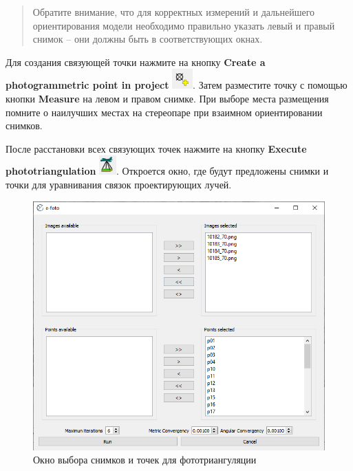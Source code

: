 \documentclass[
  12pt,
]{book}
\begin{document}
\begin{quote}
Обратите внимание, что для корректных измерений и дальнейшего ориентирования модели необходимо правильно указать левый и правый снимок -- они должны быть в соответствующих окнах.
\end{quote}

Для создания связующей точки нажмите на кнопку \textbf{Create a photogrammetric point in project} \includegraphics{images/Ref13/Tie_Point.png}. Затем разместите точку с помощью кнопки \textbf{Measure} на левом и правом снимке. При выборе места размещения помните о наилучших местах на стереопаре при взаимном ориентировании снимков.

После расстановки всех связующих точек нажмите на кнопку \textbf{Execute phototriangulation} \includegraphics{images/Ref13/Execute_EO.png}. Откроется окно, где будут предложены снимки и точки для уравнивания связок проектирующих лучей.

\begin{figure}
\centering
\includegraphics{images/Ref13/Phototriangulation_execution.png}
\caption{Окно выбора снимков и точек для фототриангуляции}
\end{figure}
\end{document}
